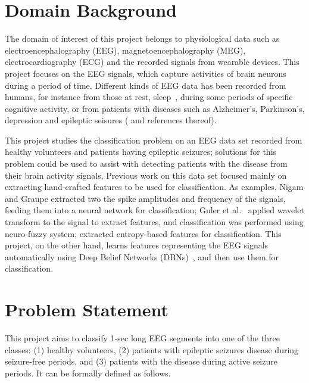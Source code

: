 \documentclass[12pt]{article}
\begin{document}
\maketitle

\section{Domain Background}

\noindent
The domain of interest of this project belongs to physiological data such as electroencephalography (EEG), magnetoencephalography (MEG), electrocardiography (ECG) and the recorded signals from wearable devices. This project focuses on the EEG signals, which capture activities of brain neurons during a period of time. Different kinds of EEG data has been recorded from humans, for instance from those at rest, sleep~\cite{langkvist2012sleep}, during some periods of specific cognitive activity, or from patients with diseases such as Alzheimer's, Parkinson's, depression and epileptic seisures (\cite{andrzejak2001indications} and references thereof).

This project studies the classification problem on an EEG data set recorded from healthy volunteers and patients having epileptic seizures; solutions for this problem could be used to assist with detecting patients with the disease from their brain activity signals. Previous work on this data set focused mainly on extracting hand-crafted features to be used for classification. As examples, Nigam and Graupe \cite{nigam2004neural} extracted two the spike amplitudes and frequency of the signals, feeding them into a neural network for classification; Guler et al.~\cite{guler2005recurrent} applied wavelet transform to the signal to extract features, and classification was performed using neuro-fuzzy system; \cite{kannathal2005entropies} extracted entropy-based features for classification. This project, on the other hand, learns features representing the EEG signals automatically using Deep Belief Networks (DBNs)~\cite{hinton2006reducing}, and then use them for classification.

\section{Problem Statement}
\noindent
This project aims to classify 1-sec long EEG segments into one of the three classes: (1) healthy volunteers, (2) patients with epileptic seizures disease during seizure-free periods, and (3) patients with the disease during active seizure periods. It can be formally defined as follows.
\end{document}
